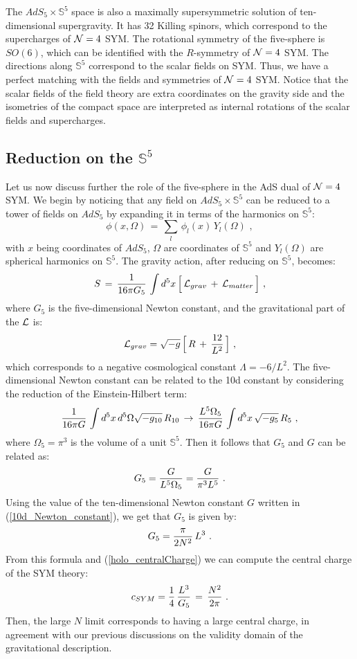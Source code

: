 \documentclass[12pt,notitlepage,a4paper]{article}
\newcommand{\beq}{\begin{equation}}
\newcommand{\eeq}{\end{equation}}
\begin{document}
The $AdS_5\times {\mathbb S}^5$ space is also a maximally supersymmetric solution of ten-dimensional supergravity. It has 32 Killing spinors, which correspond to the supercharges of ${\cal N}=4$ SYM. The rotational symmetry of the five-sphere is $SO(6)$, which can be identified  with the $R$-symmetry of ${\cal N}=4$ SYM. The directions along ${\mathbb S}^5$ correspond to the scalar fields on SYM. Thus, we have a perfect matching with the fields and symmetries of ${\cal N}=4$ SYM. Notice that the scalar fields of the field theory are extra coordinates on the gravity side and the isometries of the compact space are interpreted as internal rotations of the scalar fields and supercharges. 
 

 
\subsection{Reduction on the ${\mathbb S}^5$}
\label{KK-reduction}

Let us now discuss further the role of the five-sphere in  the AdS dual of ${\cal N}=4$ SYM.  We begin by noticing that any field on $AdS_5\times {\mathbb S}^5$ can be reduced to a tower of fields on  $AdS_5$ by expanding  it in terms of the harmonics on ${\mathbb S}^5$:
\beq
\phi(x,\Omega)\,=\,\sum_{l}\,\phi_l (x)\,Y_l(\Omega)\,\,,
\label{KK_mode_expansion}
\eeq
with  $x$   being coordinates of  $AdS_5$, $\Omega$ are coordinates of  ${\mathbb S}^5$ and $Y_l(\Omega)$ are  spherical harmonics on ${\mathbb S}^5$. The gravity action, after reducing on  ${\mathbb S}^5$,  becomes:
\beq
S\,=\,{1\over 16\pi G_5}\,\int d^5 x\,\Big[\,{\cal L}_{grav}\,+\,{\cal L}_{matter}\,\Big]\,\,,
\eeq
where $G_5$ is the five-dimensional Newton constant, and the gravitational part of the ${\cal L}$ is:
\beq
{\cal L}_{grav}=\sqrt{-g}\,\Big[\,R\,+\,{12\over L^2}\,\Big]\,\,,
\eeq
which corresponds to a negative cosmological constant $\Lambda=-6/L^2$.
The five-dimensional Newton constant can be related to the 10d constant by considering the reduction of the Einstein-Hilbert term:
\beq
{1\over 16\pi G}\,\int d^5 x \,d^5\Omega \sqrt{-g_{10}}\,R_{10}\,\to\,
{L^5\Omega_5\over 16\pi G}\,\int d^5 x \, \sqrt{-g_{5}}\,R_{5}\,\,,
\eeq
where $\Omega_5=\pi^3$ is the volume of a unit  ${\mathbb S}^5$. Then it follows that  $G_5$ and $G$ can be related as:
\beq
G_5={G\over L^5\Omega_5}={G\over \pi^3 L^5}\,\,.
\eeq
Using the value of the ten-dimensional Newton constant $G$ written in (\ref{10d_Newton_constant}), we get that $G_5$ is given by:
\beq
G_5={\pi\over 2N^2}\,L^3\,\,.
\eeq
From this formula  and (\ref{holo_centralCharge}) we can compute the central charge of the SYM theory:
\beq
c_{SYM}={1\over 4}\,{L^3\over G_5}
\,=\,{N^2\over 2\pi}\,\,.
\eeq
Then, the large $N$ limit corresponds to having a large central charge, in agreement with our previous discussions on the validity domain of the gravitational description. 
\end{document}
